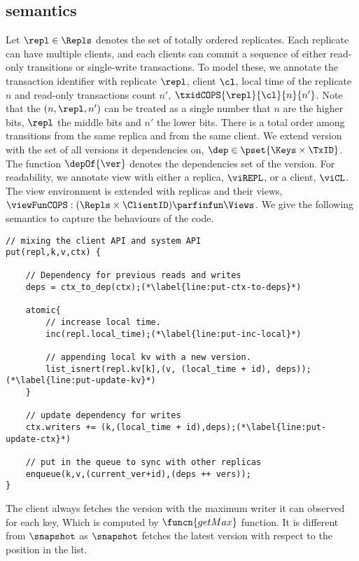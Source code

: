 \subsection{semantics}
Let \( \repl \in \Repls \) denotes the set of totally ordered replicates.
Each replicate can have multiple clients, and 
each clients can commit a sequence of either read-only transitions or single-write transactions.
To model these, we annotate the transaction identifier with replicate \( \repl \), client \( \cl \), 
local time of the replicate \( n \) and read-only transactions count \( n' \), \ie \( \txidCOPS{\repl}{\cl}{n}{n'} \).
Note that the \( (n, \repl, n') \) can be treated as a single number that \( n \) are the higher bits, 
\( \repl \) the middle bits and \( n' \) the lower bits.
There is a total order among transitions from the same replica and from the same client.
We extend version with the set of all versions it dependencies on, \( \dep \in \pset{\Keys \times \TxID} \).
The function \( \depOf{\ver} \) denotes the dependencies set of the version.
For readability, we annotate view with either a replica, \( \viREPL \), or a client, \( \viCL \).
The view environment is extended with replicas and their views, \( \viewFunCOPS : (\Repls \times \ClientID ) \parfinfun \Views \).
We give the following semantics to capture the behaviours of the code.

\begin{lstlisting}[caption={put},label={lst:simplified-put}]
// mixing the client API and system API
put(repl,k,v,ctx) {

    // Dependency for previous reads and writes
    deps = ctx_to_dep(ctx);(*\label{line:put-ctx-to-deps}*)

    atomic{
        // increase local time.
        inc(repl.local_time);(*\label{line:put-inc-local}*) 

        // appending local kv with a new version.
        list_isnert(repl.kv[k],(v, (local_time + id), deps));(*\label{line:put-update-kv}*)
    }

    // update dependency for writes
    ctx.writers += (k,(local_time + id),deps);(*\label{line:put-update-ctx}*)

    // put in the queue to sync with other replicas
    enqueue(k,v,(current_ver+id),(deps ++ vers));
}
\end{lstlisting}

The client always fetches the version with the maximum writer it can observed for each key,
Which is computed by \( \funcn{getMax} \) function. 
It is different from \( \snapshot \) as \( \snapshot \) fetches the latest version with respect to the position in the list.

